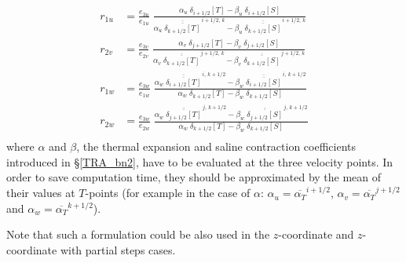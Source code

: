 {\begin{description}
\begin{equation} \label{Eq_ldfslp_iso2}
\begin{split}
 r_{1u} &= \frac{e_{3u}}{e_{1u}}\; \frac
 		{\alpha_u \;\delta_{i+1/2}[T] - \beta_u \;\delta_{i+1/2}[S]}
		{\alpha_u \;\overline{\overline{\delta_{k+1/2}[T]}}^{\,i+1/2,\,k}
		 -\beta_u  \;\overline{\overline{\delta_{k+1/2}[S]}}^{\,i+1/2,\,k} }
\\
 r_{2v} &= \frac{e_{3v}}{e_{2v}}\; \frac
 		{\alpha_v \;\delta_{j+1/2}[T] - \beta_v \;\delta_{j+1/2}[S]}
		{\alpha_v \;\overline{\overline{\delta_{k+1/2}[T]}}^{\,j+1/2,\,k}
		 -\beta_v  \;\overline{\overline{\delta_{k+1/2}[S]}}^{\,j+1/2,\,k} }
\\
 r_{1w} &= \frac{e_{3w}}{e_{1w}}\; \frac
		{\alpha_w \;\overline{\overline{\delta_{i+1/2}[T]}}^{\,i,\,k+1/2}
		 -\beta_w  \;\overline{\overline{\delta_{i+1/2}[S]}}^{\,i,\,k+1/2} }
 		{\alpha_w \;\delta_{k+1/2}[T] - \beta_w \;\delta_{k+1/2}[S]}
\\
 r_{2w} &= \frac{e_{3w}}{e_{2w}}\; \frac
		{\alpha_w \;\overline{\overline{\delta_{j+1/2}[T]}}^{\,j,\,k+1/2}
		 -\beta_w  \;\overline{\overline{\delta_{j+1/2}[S]}}^{\,j,\,k+1/2} }
 		{\alpha_w \;\delta_{k+1/2}[T] - \beta_w \;\delta_{k+1/2}[S]}
\\
\end{split}
\end{equation}
where $\alpha$ and $\beta$, the thermal expansion and saline contraction 
coefficients introduced in \S\ref{TRA_bn2}, have to be evaluated at the three 
velocity points. In order to save computation time, they should be approximated 
by the mean of their values at $T$-points (for example in the case of $\alpha$:  
$\alpha_u=\overline{\alpha_T}^{i+1/2}$,  $\alpha_v=\overline{\alpha_T}^{j+1/2}$ 
and $\alpha_w=\overline{\alpha_T}^{k+1/2}$).

Note that such a formulation could be also used in the $z$-coordinate and 
$z$-coordinate with partial steps cases.

\end{description}

}
